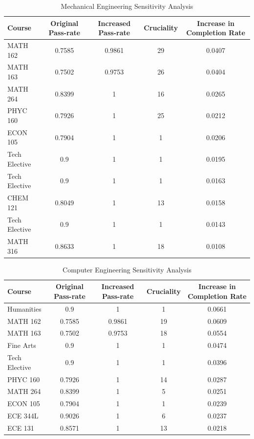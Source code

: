 \documentclass[botnum, fleqn]{unmeethesis}
\begin{document}
    \begin{table}[!h]
    \tiny
    \begin{tabular}{l*{4}{c}}
    Course & Original Pass-rate & Increased Pass-rate & Cruciality & Increase in Completion Rate \\
    \hline
    MATH 162 & 0.7585 & 0.9861 & 29 & 0.0407 \\
    MATH 163 & 0.7502 & 0.9753 & 26 & 0.0404 \\
    MATH 264 & 0.8399 & 1 & 16 & 0.0265 \\
    PHYC 160 & 0.7926 & 1 & 25 & 0.0212 \\
    ECON 105 & 0.7904 & 1 & 1 & 0.0206 \\
    Tech Elective & 0.9 & 1 & 1 & 0.0195 \\
    Tech Elective & 0.9 & 1 & 1 & 0.0163 \\
    CHEM 121 & 0.8049 & 1 & 13 & 0.0158 \\
    Tech Elective & 0.9 & 1 & 1 & 0.0143 \\
    MATH 316 & 0.8633 & 1 & 18 & 0.0108 \\
    \end{tabular}
    \caption{Mechanical Engineering Sensitivity Analysis}
    \label{tab:me_sensitivity}
    \end{table}

    \begin{table}[!h]
    \tiny
    \begin{tabular}{l*{4}{c}}
    Course & Original Pass-rate & Increased Pass-rate & Cruciality & Increase in Completion Rate \\
    \hline
    Humanities & 0.9 & 1 & 1 & 0.0661 \\
    MATH 162 & 0.7585 & 0.9861 & 19 & 0.0609 \\
    MATH 163 & 0.7502 & 0.9753 & 18 & 0.0554 \\
    Fine Arts & 0.9 & 1 & 1 & 0.0474 \\
    Tech Elective & 0.9 & 1 & 1 & 0.0396 \\
    PHYC 160 & 0.7926 & 1 & 14 & 0.0287 \\
    MATH 264 & 0.8399 & 1 & 5 & 0.0251 \\
    ECON 105 & 0.7904 & 1 & 1 & 0.0239 \\
    ECE 344L & 0.9026 & 1 & 6 & 0.0237 \\
    ECE 131 & 0.8571 & 1 & 13 & 0.0218 \\
    \end{tabular}
    \caption{Computer Engineering Sensitivity Analysis}
    \label{tab:cpe_sensitivity}
    \end{table}
\end{document}
